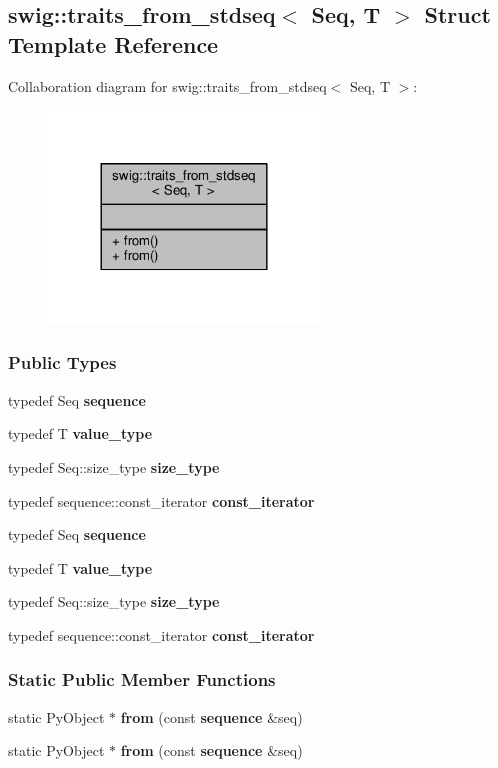 \subsection{swig\+:\+:traits\+\_\+from\+\_\+stdseq$<$ Seq, T $>$ Struct Template Reference}
\label{structswig_1_1traits__from__stdseq}


Collaboration diagram for swig\+:\+:traits\+\_\+from\+\_\+stdseq$<$ Seq, T $>$\+:
\nopagebreak
\begin{figure}[H]
\begin{center}
\leavevmode
\includegraphics[width=204pt]{de/d4e/structswig_1_1traits__from__stdseq__coll__graph}
\end{center}
\end{figure}
\subsubsection*{Public Types}
\begin{DoxyCompactItemize}
\item 
typedef Seq {\bf sequence}
\item 
typedef T {\bf value\+\_\+type}
\item 
typedef Seq\+::size\+\_\+type {\bf size\+\_\+type}
\item 
typedef sequence\+::const\+\_\+iterator {\bf const\+\_\+iterator}
\item 
typedef Seq {\bf sequence}
\item 
typedef T {\bf value\+\_\+type}
\item 
typedef Seq\+::size\+\_\+type {\bf size\+\_\+type}
\item 
typedef sequence\+::const\+\_\+iterator {\bf const\+\_\+iterator}
\end{DoxyCompactItemize}
\subsubsection*{Static Public Member Functions}
\begin{DoxyCompactItemize}
\item 
static Py\+Object $\ast$ {\bf from} (const {\bf sequence} \&seq)
\item 
static Py\+Object $\ast$ {\bf from} (const {\bf sequence} \&seq)
\end{DoxyCompactItemize}



